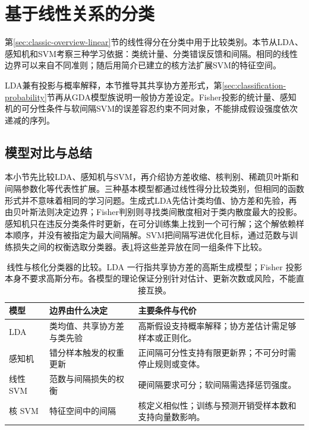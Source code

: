 \section{基于线性关系的分类}
\label{sec:classification-geometry}

第\ref{sec:classic-overview-linear}节的线性得分在分类中用于比较类别。本节从LDA、感知机和SVM考察三种学习依据：类统计量、分类错误反馈和间隔。相同的线性边界可以来自不同准则；随后用简介已建立的核方法扩展SVM的特征空间。

LDA兼有投影与概率解释，本节推导其共享协方差形式，第\ref{sec:classification-probability}节再从GDA模型族说明一般协方差设定。Fisher投影的统计量、感知机的可分性条件与软间隔SVM的误差容忍约束不同对象，不能排成假设强度依次递减的序列。




\subsection{模型对比与总结}
\label{sec:classification-geometry-summary}

本小节先比较LDA、感知机与SVM，再介绍协方差收缩、核判别、稀疏贝叶斯和间隔参数化等代表性扩展。三种基本模型都通过线性得分比较类别，但相同的函数形式并不意味着相同的学习问题。生成式LDA先估计类均值、协方差和先验，再由贝叶斯法则决定边界；Fisher判别则寻找类间散度相对于类内散度最大的投影。感知机只在违反分类条件时更新，在可分训练集上找到一个可行解；这个解依赖样本顺序，并没有被指定为最大间隔解。SVM把间隔写进优化目标，通过范数与训练损失之间的权衡选取分类器。表\ref{tab:classification-linear-comparison}将这些差异放在同一组条件下比较。

\begin{table}[htbp]
  \centering
  \small
  \begin{tabularx}{\linewidth}{@{}>{\RaggedRight\arraybackslash}p{18mm}>{\RaggedRight\arraybackslash}X>{\RaggedRight\arraybackslash}X@{}}
    \toprule
    模型 & 边界由什么决定 & 主要条件与代价 \\
    \midrule
    LDA & 类均值、共享协方差与类先验 & 高斯假设支持概率解释；协方差估计需足够样本或正则化。 \\
    感知机 & 错分样本触发的权重更新 & 正间隔可分性支持有限更新界；不可分时需停止规则或变体。 \\
    线性 SVM & 范数与间隔损失的权衡 & 硬间隔要求可分；软间隔需选择惩罚强度。 \\
    核 SVM & 特征空间中的间隔 & 核定义相似性；训练与预测开销受样本数和支持向量数影响。 \\
    \bottomrule
  \end{tabularx}
  \caption{线性与核化分类器的比较。LDA 一行指共享协方差的高斯生成模型；Fisher 投影本身不要求高斯分布。各模型的理论保证分别针对估计、更新次数或风险，不能直接互换。}
  \label{tab:classification-linear-comparison}
\end{table}

